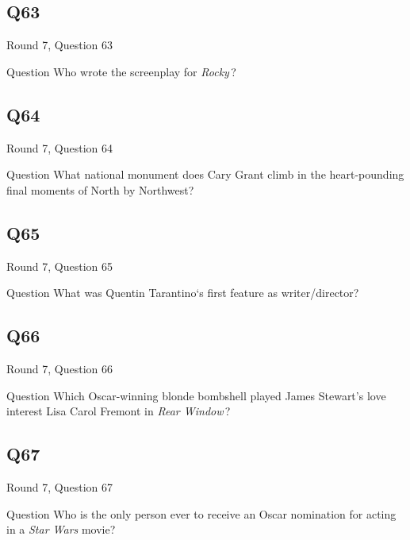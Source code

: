 \documentclass[11pt]{beamer}
\begin{document}
\subsection*{Q63}
\begin{frame}[t]{Round 7, Question 63}
  \vspace{2em}
  \begin{block}{Question}
    Who wrote the screenplay for \emph{Rocky}\,?
  \end{block}
\end{frame}


\subsection*{Q64}
\begin{frame}[t]{Round 7, Question 64}
  \vspace{2em}
  \begin{block}{Question}
    What national monument does Cary Grant climb in the heart-pounding final moments of North by Northwest?
  \end{block}
\end{frame}


\subsection*{Q65}
\begin{frame}[t]{Round 7, Question 65}
  \vspace{2em}
  \begin{block}{Question}
    What was Quentin Tarantino`s first feature as writer/director?
  \end{block}
\end{frame}


\subsection*{Q66}
\begin{frame}[t]{Round 7, Question 66}
  \vspace{2em}
  \begin{block}{Question}
    Which Oscar-winning blonde bombshell played James Stewart's love interest Lisa Carol Fremont in \emph{Rear Window}\,?
  \end{block}
\end{frame}


\subsection*{Q67}
\begin{frame}[t]{Round 7, Question 67}
  \vspace{2em}
  \begin{block}{Question}
    Who is the only person ever to receive an Oscar nomination for acting in a \emph{Star Wars} movie?
  \end{block}
\end{frame}
\end{document}
